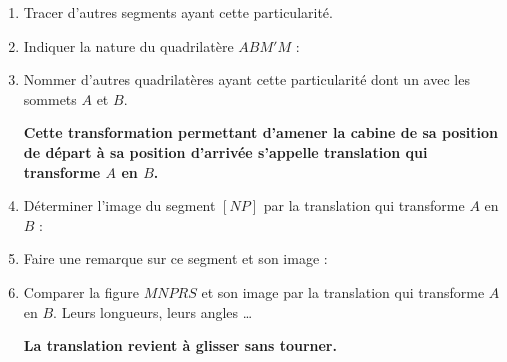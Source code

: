 \begin{activite}[La cabine]
\begin{enumerate}
        \smallskip\pointilles
        \item Tracer d'autres segments ayant cette particularité.
        \item Indiquer la nature du quadrilatère $ABM'M$ : \pointilles
        \item Nommer d'autres quadrilatères ayant cette particularité dont un avec les sommets $A$ et $B$.
        
        \smallskip\pointilles
        
        \smallskip
        {\bfseries Cette transformation permettant d'amener la cabine de sa position de départ à sa position d'arrivée s'appelle translation qui transforme $A$ en $B$.}
        \smallskip

        \smallskip
        \item Déterminer l'image du segment $[NP]$ par la translation qui transforme $A$ en $B$ : \pointilles
        
        \smallskip\pointilles

        \smallskip
        \item Faire une remarque sur ce segment et son image : \pointilles
        
        \smallskip\pointilles
        \item Comparer la figure $MNPRS$ et son image par la translation qui transforme $A$ en $B$. Leurs longueurs, leurs angles \dots
        
        \smallskip\pointilles

        \smallskip\pointilles

        \smallskip
        {\bfseries La translation revient à glisser sans tourner.}
        \smallskip
    \end{enumerate}
\end{activite}
